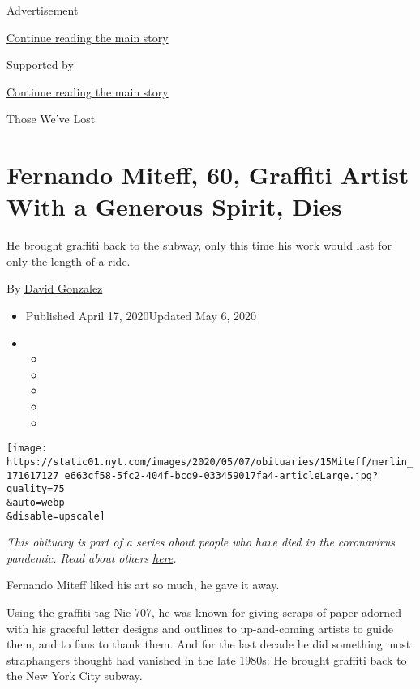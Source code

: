 Advertisement

\protect\hyperlink{after-top}{Continue reading the main story}

Supported by

\protect\hyperlink{after-sponsor}{Continue reading the main story}

Those We've Lost

\hypertarget{fernando-miteff-60-graffiti-artist-with-a-generous-spirit-dies}{%
\section{Fernando Miteff, 60, Graffiti Artist With a Generous Spirit,
Dies}\label{fernando-miteff-60-graffiti-artist-with-a-generous-spirit-dies}}

He brought graffiti back to the subway, only this time his work would
last for only the length of a ride.

By \href{https://www.nytimes.com/by/david-gonzalez}{David Gonzalez}

\begin{itemize}
\item
  Published April 17, 2020Updated May 6, 2020
\item
  \begin{itemize}
  \item
  \item
  \item
  \item
  \item
  \end{itemize}
\end{itemize}

\texttt{[image: https://static01.nyt.com/images/2020/05/07/obituaries/15Miteff/merlin\_171617127\_e663cf58-5fc2-404f-bcd9-033459017fa4-articleLarge.jpg?quality=75\\\&auto=webp\\\&disable=upscale]}

\emph{This obituary is part of a series about people who have died in
the coronavirus pandemic. Read about others}
\href{https://www.nytimes.com/series/people-who-have-died-of-the-coronavirus}{\emph{here}}\emph{.}

Fernando Miteff liked his art so much, he gave it away.

Using the graffiti tag Nic 707, he was known for giving scraps of paper
adorned with his graceful letter designs and outlines to up-and-coming
artists to guide them, and to fans to thank them. And for the last
decade he did something most straphangers thought had vanished in the
late 1980s: He brought graffiti back to the New York City subway.

